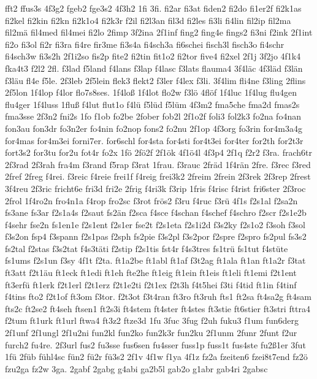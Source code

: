 {fft2
ffus3s
4f3g2
fgeb2
fge3s2
4f3h2
1fi
3fi.
fi2ar
fi3at
fiden2
fi2do
fi1er2f
fi2k1as
fi2kel
fi2kin
fi2kn
fi2k1o4
fi2k3r
f2il
fi2l3an
fil3d
fi2les
fi3li
fi4lin
fil2ip
fil2ma
fil2mä
fil4med
fil4mei
fi2lo
2fimp
3f2ina
2f1inf
fing2
fing4e
fings2
fi3ni
f2ink
2f1int
fi2o
fi3ol
fi2r
fi3ra
fi4re
fir3me
fi3s4a
fi4sch3a
fi6schei
fisch3l
fisch3o
fi4schr
fi4sch3w
fi3s2h
2f1i2so
fis2p
fite2
fi2tin
fit1o2
fi2tor
five4
fi2xel
2f1j
3f2jo
4f1k4
fka4t3
f2l2
2fl.
f3lad
f5land
f4lans
f3lap
f4lasc
f3lats
flauma4
3f4läc
4f3läd
f3län
f3läu
fl4e
f5le.
2f3leb
2f5lein
flek3
flekt2
f3ler
f4lex
f3li.
3f4lim
fli4ne
f3ling
2flins
2f5lon
1f4lop
f4lor
flo7s8ses.
1f4loß
1f4lot
flo2w
f3lö
4flöf
1f4luc
1f4lug
flu4gen
flu4ger
1f4luss
1fluß
f4lut
flut1o
f4lü
f5lüd
f5lüm
4f3m2
fma5che
fma2d
fmas2s
fma3sse
2f3n2
fni2s
1fo
f1ob
fo2be
2fober
fob2l
2f1o2f
foli3
fol2k3
fo2na
fo4nan
fon3au
fon3dr
fo3n2er
fo4nin
fo2nop
fons2
fo2nu
2f1op
4f3org
fo3rin
for4m3a4g
for4mas
for4m3ei
forni7er.
for6schl
for4sta
for4sti
for4t3ei
for4ter
for2th
for2t3r
fort3s2
for3tu
for2u
fot4r
fo2x
1fö
2fö2f
2f1ök
4f1ö4l
4f3p4
2f1q
f2r2
f3ra.
frach6tr
2f3rad
2f3rah
fra4m
f3rand
f5rap
f3rat
1frau.
f3rauc
2fräd
1f4rän
2fre.
f3rec
f3red
2fref
2freg
f4rei.
f3reic
f4reie
frei1f
f4reig
frei3k2
2freim
2frein
2f3rek
2f3rep
2frest
3f4reu
2f3ric
fricht6e
fri3d
fri2e
2frig
f4ri3k
f3rip
1fris
f4risc
f4rist
fri6ster
2f3roc
2frol
1f4ro2n
fro4n1a
f4rop
fro2sc
f3rot
frös2
f3ru
f4ruc
f3rü
4f1s
f2s1al
f2sa2n
fs3ane
fs3ar
f2s1a4s
f2saut
fs2än
f2sca
f4sce
f4schan
f4schef
f4schro
f2scr
f2s1e2b
f4sehr
fse2n
fs1en1e
f2s1ent
f2s1er
fse2t
f2s1eta
f2s1i2d
f3s2ky
f2s1o2
f3soh
f3sol
f3s2on
fsp4
f3spann
f2s1pas
f2sph
fs2pie
f3s2pl
f3s2por
f2spre
f2spro
fs2pul
fs3s2
fs2tal
f2stas
f3s2tat
f4s3täti
f2stip
f2s1tis
fst4r
f4s3tres
fs1trü
fs1tut
f4stüte
fs1ums
f2s1un
f3sy
4f1t
f2ta.
ft1a2be
ft1abl
ft1af
f3t2ag
ft1ala
ft1an
ft1a2r
f3tat
ft3att
f2t1äu
ft1eck
ft1edi
ft1eh
fte2he
ft1eig
ft1ein
ft1eis
ft1eli
ft1emi
f2t1ent
ft3erfü
ft1erk
f2t1erl
f2t1erz
f2t1e2ti
f2t1ex
f2t3h
f4t5hei
f3ti
f4tid
ft1in
f4tinf
f4tins
fto2
f2t1of
ft3om
f3tor.
f2t3ot
f3t4ran
ft3ro
ft3ruh
fts1
ft2sa
ft4sa2g
ft4sam
fts2c
ft2se2
ft4seh
ftsen1
ft2s3i
ft4stem
ft4ster
ft4stes
ft3stie
ft6stier
ft3stri
fttra4
f2tum
ft1urk
ft1url
ftwa4
ft3z2
ftze3d
1fu
3fuc
3fug
f2uh
fuku3
f1um
fun6derg
2f1unf
2f1ungl
2f1u2ni
fun2kl
fun2ko
fun2k3r
fun2ku
2f1unm
2funr
2funt
f2ur
furch2
fu4re.
2f3url
fus2
fu3sse
fus6sen
fu4sser
fuss1p
fuss1t
fus4ste
fu2ß1er
3fut
1fü
2füb
fühl4sc
fün2
fü2r
fü3s2
2f1v
4f1w
f1ya
4f1z
fz2a
fzeiten6
fzei8t7end
fz2ö
fzu2ga
fz2w
3ga.
2gabf
2gabg
g4abi
ga2b5l
gab2o
g1abr
gab4ri
2gabsc
}
